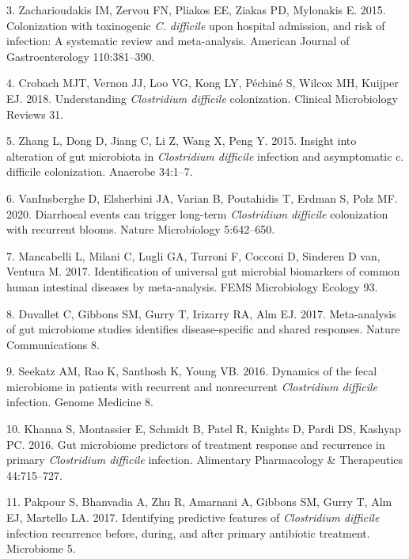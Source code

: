 \documentclass[11pt,]{article}
\begin{document}
\hypertarget{ref-Zacharioudakis2015}{}
3. Zacharioudakis IM, Zervou FN, Pliakos EE, Ziakas PD, Mylonakis E.
2015. Colonization with toxinogenic \emph{C. difficile} upon hospital
admission, and risk of infection: A systematic review and meta-analysis.
American Journal of Gastroenterology 110:381--390.

\hypertarget{ref-Crobach2018}{}
4. Crobach MJT, Vernon JJ, Loo VG, Kong LY, Péchiné S, Wilcox MH,
Kuijper EJ. 2018. Understanding \emph{Clostridium difficile}
colonization. Clinical Microbiology Reviews 31.

\hypertarget{ref-Zhang2015}{}
5. Zhang L, Dong D, Jiang C, Li Z, Wang X, Peng Y. 2015. Insight into
alteration of gut microbiota in \emph{Clostridium difficile} infection
and asymptomatic c. difficile colonization. Anaerobe 34:1--7.

\hypertarget{ref-VanInsberghe2020}{}
6. VanInsberghe D, Elsherbini JA, Varian B, Poutahidis T, Erdman S, Polz
MF. 2020. Diarrhoeal events can trigger long-term \emph{Clostridium
difficile} colonization with recurrent blooms. Nature Microbiology
5:642--650.

\hypertarget{ref-Mancabelli2017}{}
7. Mancabelli L, Milani C, Lugli GA, Turroni F, Cocconi D, Sinderen D
van, Ventura M. 2017. Identification of universal gut microbial
biomarkers of common human intestinal diseases by meta-analysis. FEMS
Microbiology Ecology 93.

\hypertarget{ref-Duvallet2017}{}
8. Duvallet C, Gibbons SM, Gurry T, Irizarry RA, Alm EJ. 2017.
Meta-analysis of gut microbiome studies identifies disease-specific and
shared responses. Nature Communications 8.

\hypertarget{ref-Seekatz2016}{}
9. Seekatz AM, Rao K, Santhosh K, Young VB. 2016. Dynamics of the fecal
microbiome in patients with recurrent and nonrecurrent \emph{Clostridium
difficile} infection. Genome Medicine 8.

\hypertarget{ref-Khanna2016}{}
10. Khanna S, Montassier E, Schmidt B, Patel R, Knights D, Pardi DS,
Kashyap PC. 2016. Gut microbiome predictors of treatment response and
recurrence in primary \emph{Clostridium difficile} infection. Alimentary
Pharmacology \& Therapeutics 44:715--727.

\hypertarget{ref-Pakpour2017}{}
11. Pakpour S, Bhanvadia A, Zhu R, Amarnani A, Gibbons SM, Gurry T, Alm
EJ, Martello LA. 2017. Identifying predictive features of
\emph{Clostridium difficile} infection recurrence before, during, and
after primary antibiotic treatment. Microbiome 5.
\end{document}
